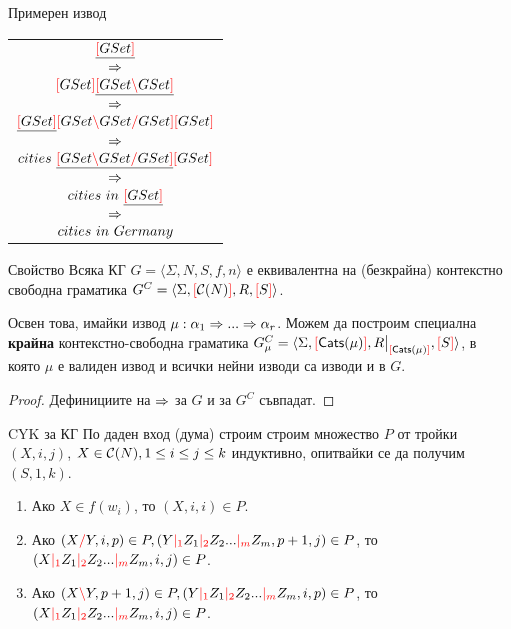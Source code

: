 \documentclass[9pt]{beamer}
\begin{document}
  \begin{frame}{Примерен извод}
    \begin{center}
        \begin{tabular}{c}
            $\underline{\textcolor{red}{[} GSet \textcolor{red}{]}}$ \\ $\Rightarrow$ \\
            $\textcolor{red}{[} GSet \textcolor{red}{]} \underline{\textcolor{red}{[} GSet \textcolor{red}{\backslash} GSet \textcolor{red}{]}}$ \\ $\Rightarrow$ \\
            $\underline{\textcolor{red}{[} GSet \textcolor{red}{]}} \textcolor{red}{[} GSet \textcolor{red}{\backslash} GSet \textcolor{red}{/} GSet \textcolor{red}{]} \textcolor{red}{[} GSet \textcolor{red}{]}$ \\ $\Rightarrow$ \\
            $cities \text{ } \underline{\textcolor{red}{[} GSet \textcolor{red}{\backslash} GSet \textcolor{red}{/} GSet \textcolor{red}{]}} \textcolor{red}{[} GSet \textcolor{red}{]}$ \\ $\Rightarrow$ \\
            $cities \text{ } in \text{ } \underline{\textcolor{red}{[} GSet \textcolor{red}{]}}$ \\ $\Rightarrow$ \\
            $cities \text{ } in \text{ } Germany$ \\
        \end{tabular}
    \end{center}
  \end{frame}

  \begin{frame}{Свойство}
    Всяка КГ $G = \langle \Sigma, N, S, f, n \rangle$ е еквивалентна на
    (безкрайна) контекстно свободна граматика
    $G^C = \langle \Sigma, \textcolor{red}{[} \mathcal{C}( N ) \textcolor{red}{]}, R, \textcolor{red}{[} S \textcolor{red}{]} \rangle$.

    Освен това, имайки извод $\mu: \alpha_1 \Rightarrow ... \Rightarrow \alpha_r$.
    Можем да построим специална \textbf{крайна} контекстно-свободна граматика
    $G_\mu^C = \langle \Sigma, \lb \catsin{\mu} \rb, \restr{R}{\lb \catsin{\mu} \rb}, \lb S \rb \rangle$,
    в която $\mu$ е валиден извод и всички нейни изводи са изводи и в $G$.

    \begin{proof}
        Дефинициите на $\Rightarrow$ за $G$ и за $G^C$ съвпадат.
    \end{proof}
  \end{frame}

  \begin{frame}{CYK за КГ}
    По даден вход (дума) строим строим множество $P$ от тройки
    $(X, i, j)$, $X \in \mathcal{C}( N ), 1 \leq i \leq j \leq k$ индуктивно,
    опитвайки се да получим
    $(S, 1, k)$.

    \begin{enumerate}
    \label{cyk:rules}
        \item Ако $X \in f(w_i)$, то $(X, i, i) \in P$.
        \item Ако $(X \textcolor{red}{/} Y, i, p) \in P, (Y \textcolor{red}{|_{1}} Z_1 \textcolor{red}{|_{2}} Z_2 ... \textcolor{red}{|_{m}} Z_m, p + 1, j) \in P$,
            то $(X \textcolor{red}{|_{1}} Z_1 \textcolor{red}{|_{2}} Z_2 ... \textcolor{red}{|_{m}} Z_m, i, j) \in P$.
        \item Ако $(X \textcolor{red}{\backslash} Y, p + 1, j) \in P, (Y \textcolor{red}{|_{1}} Z_1 \textcolor{red}{|_{2}} Z_2 ... \textcolor{red}{|_{m}} Z_m, i, p) \in P$,
            то $(X \textcolor{red}{|_{1}} Z_1 \textcolor{red}{|_{2}} Z_2 ... \textcolor{red}{|_{m}} Z_m, i, j) \in P$.
    \end{enumerate}
  \end{frame}
\end{document}
